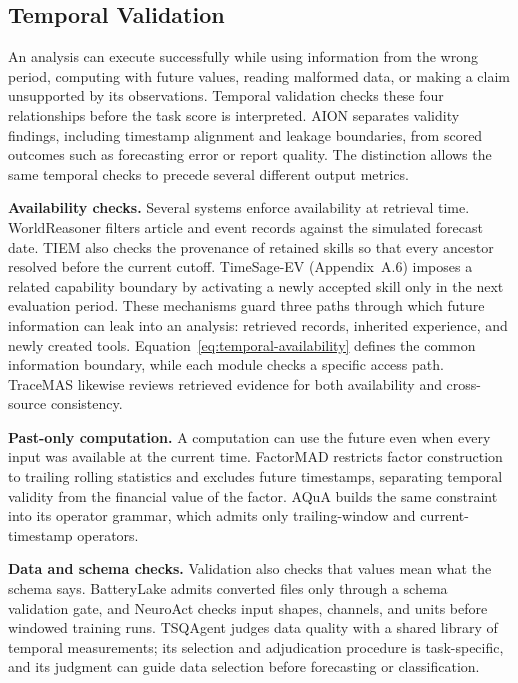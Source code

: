 \documentclass[preprints,article,submit,moreauthors]{Definitions/mdpi}
\begin{document}
\subsection{Temporal Validation}
\label{sec:temporal-validation}

An analysis can execute successfully while using information from the wrong period, computing with future values, reading malformed data, or making a claim unsupported by its observations. Temporal validation checks these four relationships before the task score is interpreted. AION \citep{aion2026} separates validity findings, including timestamp alignment and leakage boundaries, from scored outcomes such as forecasting error or report quality. The distinction allows the same temporal checks to precede several different output metrics.

\noindent\textbf{Availability checks.} Several systems enforce availability at retrieval time. WorldReasoner \citep{worldreasoner2026} filters article and event records against the simulated forecast date. TIEM \citep{tiem2026} also checks the provenance of retained skills so that every ancestor resolved before the current cutoff. TimeSage-EV \citep{timesageev2026} (Appendix~A.6) imposes a related capability boundary by activating a newly accepted skill only in the next evaluation period. These mechanisms guard three paths through which future information can leak into an analysis: retrieved records, inherited experience, and newly created tools. Equation~\eqref{eq:temporal-availability} defines the common information boundary, while each module checks a specific access path. TraceMAS \citep{tracemas2026} likewise reviews retrieved evidence for both availability and cross-source consistency.

\noindent\textbf{Past-only computation.} A computation can use the future even when every input was available at the current time. FactorMAD \citep{duan2025factormad} restricts factor construction to trailing rolling statistics and excludes future timestamps, separating temporal validity from the financial value of the factor. AQuA \citep{aqua2026} builds the same constraint into its operator grammar, which admits only trailing-window and current-timestamp operators.

\noindent\textbf{Data and schema checks.} Validation also checks that values mean what the schema says. BatteryLake \citep{batterylake2026} admits converted files only through a schema validation gate, and NeuroAct \citep{neuroact2026} checks input shapes, channels, and units before windowed training runs. TSQAgent \citep{tsqbench2026} judges data quality with a shared library of temporal measurements; its selection and adjudication procedure is task-specific, and its judgment can guide data selection before forecasting or classification.
\end{document}
